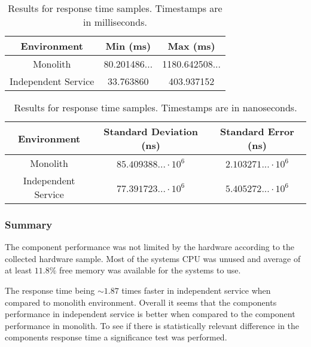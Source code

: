 \begin{table}[h!]
    \begin{tabular}{|c|c|c|} 
        \hline
        Environment
        & Min (ms)
        & Max (ms) \\ [0.5ex] 
        
        \hline\hline
        Monolith
        & 80.201486... 
        & 1180.642508...
        \\ 
        
        Independent Service
        & 33.763860
        & 403.937152
        \\
        \hline
    \end{tabular}
    \caption{Results for response time samples. Timestamps are in milliseconds.}
    \label{table:response time results:2}
\end{table}

\begin{table}[h!]
    \begin{tabular}{|c|c|c|} 
        \hline
        Environment
        & Standard Deviation (ns)
        & Standard Error (ns) \\ [0.5ex] 
        
        \hline\hline
        Monolith
        & $85.409388... \cdot 10^6$
        & $2.103271... \cdot 10^6$
        \\ 
        
        Independent Service
        & $77.391723... \cdot 10^6$
        & $5.405272... \cdot 10^6$
        \\ 
         \hline
    \end{tabular}
    \caption{Results for response time samples. Timestamps are in nanoseconds.}
    \label{table:response time results:3}
\end{table}

\subsubsection{Summary}
The component performance was not limited by the hardware according to the collected hardware sample.
Most of the systems CPU was unused and average of at least $11.8\%$ free memory was available for the systems to use.

The response time being $\sim 1.87$ times faster in independent service when compared to monolith environment.
Overall it seems that the components performance in independent service is better when compared to the component performance in monolith.
To see if there is statistically relevant difference in the components response time a significance test was performed.

